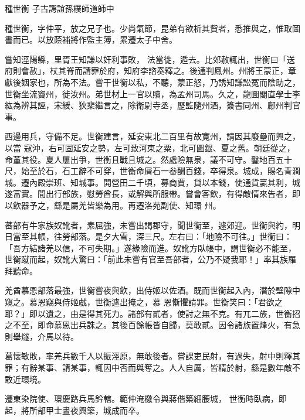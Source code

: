 
\begin{pinyinscope}

 種世衡
 子古諤誼孫樸師道師中



 種世衡，字仲平，放之兄子也。少尚氣節，昆弟有欲析其貲者，悉推與之，惟取圖書而已。以放蔭補將作監主簿，累遷太子中舍。



 嘗知涇陽縣，里胥王知謙以奸利事敗，
 法當徙，遁去。比郊赦輒出，世衡曰「送府則會赦」，杖其脊而請罪於府，知府李諮奏釋之。後通判鳳州。州將王蒙正，章獻後姻家也，所為不法。嘗干世衡以私，不聽，蒙正怒，乃誘知謙訟冤而陰助之，世衡坐流竇州，徙汝州。弟世材上一官以贖，為孟州司馬。久之，龍圖閣直學士李紘為辨其誣，宋綬、狄棐繼言之，除衛尉寺丞，歷監隨州酒，簽書同州、鄜州判官事。



 西邊用兵，守備不足。世衡建言，延安東北二百里有故寬州，請因其廢壘而興之，以當
 寇沖，右可固延安之勢，左可致河東之粟，北可圖銀、夏之舊。朝廷從之，命董其役。夏人屢出爭，世衡且戰且城之。然處險無泉，議不可守。鑿地百五十尺，始至於石，石工辭不可穿，世衡命屑石一畚酬百錢，卒得泉。城成，賜名青澗城。遷內殿崇班、知城事。開營田二千頃，募商賈，貸以本錢，使通貨贏其利，城遂富實。間出行部族，慰勞酋長，或解與所服帶。嘗會客飲，有得敵情來告者，即以飲器予之，繇是屬羌皆樂為用。再遷洛苑副使、知環
 州。



 蕃部有牛家族奴訛者，素屈強，未嘗出謁郡守，聞世衡至，遽郊迎。世衡與約，明日當至其帳，往勞部落。是夕大雪，深三尺。左右曰：「地險不可往。」世衡曰：「吾方結諸羌以信，不可失期。」遂緣險而進。奴訛方臥帳中，謂世衡必不能至，世衡蹴而起，奴訛大驚曰：「前此未嘗有官至吾部者，公乃不疑我耶！」率其族羅拜聽命。



 羌酋慕恩部落最強，世衡嘗夜與飲，出侍姬以佐酒。既而世衡起入內，潛於壁隙中窺之。慕恩竊與侍姬戲，世衡遽出掩之，慕
 恩慚懼請罪。世衡笑曰：「君欲之耶？」即以遺之，由是得其死力。諸部有貳者，使討之無不克。有兀二族，世衡招之不至，即命慕恩出兵誅之。其後百餘帳皆自歸，莫敢貳。因令諸族置烽火，有急則舉燧，介馬以待。



 葛懷敏敗，率羌兵數千人以振涇原，無敢後者。嘗課吏民射，有過失，射中則釋其罪；有辭某事、請某事，輒因中否而與奪之。人人自厲，皆精於射，繇是數年敵不敢近環境。



 遷東染院使、環慶路兵馬鈐轄。範仲淹檄令與蔣偕築細腰城，
 世衡時臥病，即起，將所部甲士晝夜興築，城成而卒。




\end{pinyinscope}
